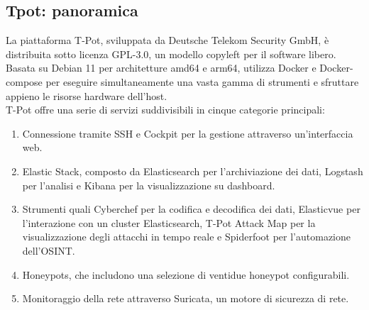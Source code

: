 \documentclass[12pt,a4paper,oneside,onecolumn,openright]{book}
\begin{document}
	\subsection{Tpot: panoramica}
	La piattaforma T-Pot, sviluppata da Deutsche Telekom Security GmbH, è distribuita sotto licenza GPL-3.0, un modello copyleft per il software libero. Basata su Debian 11 per architetture amd64 e arm64, utilizza Docker e Docker-compose per eseguire simultaneamente una vasta gamma di strumenti e sfruttare appieno le risorse hardware dell'host. \\
	T-Pot offre una serie di servizi suddivisibili in cinque categorie principali:
	\begin{enumerate}
		\item Connessione tramite SSH e Cockpit per la gestione attraverso un'interfaccia web. 
		\item Elastic Stack, composto da Elasticsearch per l'archiviazione dei dati, Logstash per l'analisi e Kibana per la visualizzazione su dashboard.
		\item Strumenti quali Cyberchef per la codifica e decodifica dei dati, Elasticvue per l'interazione con un cluster Elasticsearch, T-Pot Attack Map per la visualizzazione degli attacchi in tempo reale e Spiderfoot per l'automazione dell'OSINT.
		\item Honeypots, che includono una selezione di ventidue honeypot configurabili.
		\item Monitoraggio della rete attraverso Suricata, un motore di sicurezza di rete.
	\end{enumerate}
	
\end{document}
